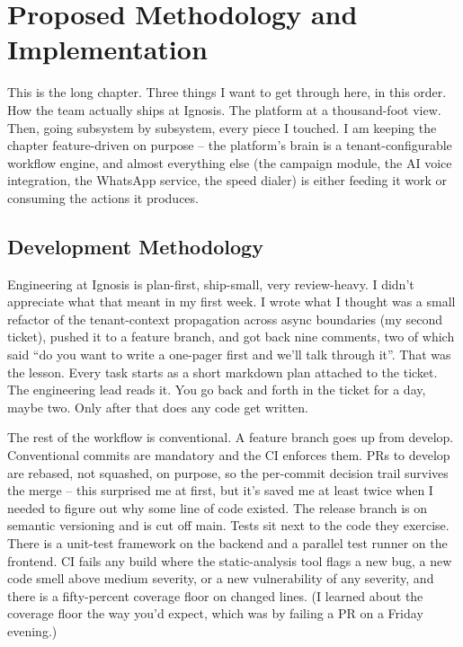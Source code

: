 \chapter{Proposed Methodology and Implementation}
\label{Chapter 3}

This is the long chapter. Three things I want to get through here, in this order. How the team actually ships at Ignosis. The platform at a thousand-foot view. Then, going subsystem by subsystem, every piece I touched. I am keeping the chapter feature-driven on purpose -- the platform's brain is a tenant-configurable workflow engine, and almost everything else (the campaign module, the AI voice integration, the WhatsApp service, the speed dialer) is either feeding it work or consuming the actions it produces.

\section{Development Methodology}
Engineering at Ignosis is plan-first, ship-small, very review-heavy. I didn't appreciate what that meant in my first week. I wrote what I thought was a small refactor of the tenant-context propagation across async boundaries (my second ticket), pushed it to a feature branch, and got back nine comments, two of which said ``do you want to write a one-pager first and we'll talk through it''. That was the lesson. Every task starts as a short markdown plan attached to the ticket. The engineering lead reads it. You go back and forth in the ticket for a day, maybe two. Only after that does any code get written.

The rest of the workflow is conventional. A feature branch goes up from develop. Conventional commits are mandatory and the CI enforces them. PRs to develop are rebased, not squashed, on purpose, so the per-commit decision trail survives the merge -- this surprised me at first, but it's saved me at least twice when I needed to figure out why some line of code existed. The release branch is on semantic versioning and is cut off main. Tests sit next to the code they exercise. There is a unit-test framework on the backend and a parallel test runner on the frontend. CI fails any build where the static-analysis tool flags a new bug, a new code smell above medium severity, or a new vulnerability of any severity, and there is a fifty-percent coverage floor on changed lines. (I learned about the coverage floor the way you'd expect, which was by failing a PR on a Friday evening.)

